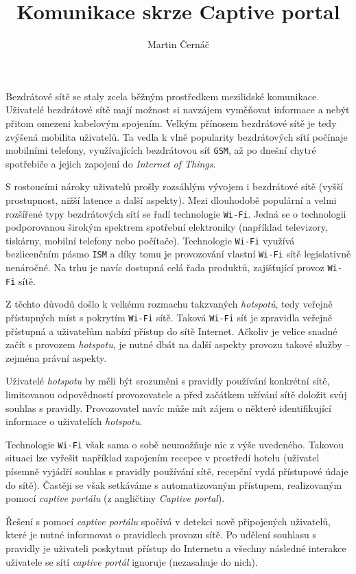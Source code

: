 \documentclass[thesis=M,czech]{FITthesis}[2012/10/20]
\title{Komunikace skrze Captive portal}
\author{Martin Černáč} %
\begin{document}
\begin{introduction}
Bezdrátové sítě se staly zcela běžným prostředkem mezilidské komunikace. Uživatelé bezdrátové sítě mají možnost si navzájem vyměňovat informace a nebýt přitom omezeni kabelovým spojením. Velkým přínosem bezdrátové sítě je tedy zvýšená mobilita uživatelů. Ta vedla k vlně popularity bezdrátových sítí počínaje mobilními telefony, využívajících bezdrátovou síť \texttt{GSM}, až po dnešní chytré spotřebiče a jejich zapojení do \textit{Internet of Things}.

S rostoucími nároky uživatelů prošly rozsáhlým vývojem i bezdrátové sítě (vyšší prostupnost, nižší latence a další aspekty). Mezi dlouhodobě populární a velmi rozšířené typy bezdrátových sítí se řadí technologie \texttt{Wi-Fi}. Jedná se o technologii podporovanou širokým spektrem spotřební elektroniky (například televizory, tiskárny, mobilní telefony nebo počítače). Technologie \texttt{Wi-Fi} využívá bezlicenčním pásmo \texttt{ISM} a díky tomu je provozování vlastní \texttt{Wi-Fi} sítě legislativně nenáročné. Na trhu je navíc dostupná celá řada produktů, zajišťující provoz \texttt{Wi-Fi} sítě.

Z těchto důvodů došlo k velkému rozmachu takzvaných \textit{hotspotů}, tedy veřejně přístupných míst s pokrytím \texttt{Wi-Fi} sítě. Taková \texttt{Wi-Fi} síť je zpravidla veřejně přístupná a uživatelům nabízí přístup do sítě Internet. Ačkoliv je velice snadné začít s provozem \textit{hotspotu}, je nutné dbát na další aspekty provozu takové služby -- zejména právní aspekty.

Uživatelé \textit{hotspotu} by měli být srozuměni s pravidly používání konkrétní sítě, limitovanou odpovědností provozovatele a před začátkem užívání sítě doložit svůj souhlas s pravidly. Provozovatel navíc může mít zájem o některé identifikující informace o uživatelích \textit{hotspotu}.

Technologie \texttt{Wi-Fi} však sama o sobě neumožňuje nic z výše uvedeného. Takovou situaci lze vyřešit například zapojením recepce v prostředí hotelu (uživatel písemně vyjádří souhlas s pravidly používání sítě, recepční vydá přístupové údaje do sítě). Častěji se však setkáváme s automatizovaným přístupem, realizovaným pomocí \textit{captive portálu} (z angličtiny \textit{Captive portal}).

Řešení s pomocí \textit{captive portálu} spočívá v detekci nově připojených uživatelů, které je nutné informovat o pravidlech provozu sítě. Po udělení souhlasu s pravidly je uživateli poskytnut přístup do Internetu a všechny následné interakce uživatele se sítí \textit{captive portál} ignoruje (nezasahuje do nich).


\end{introduction}
\end{document}

